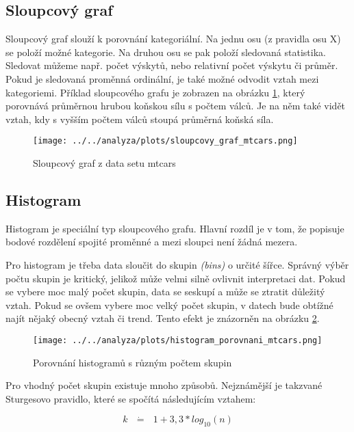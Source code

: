 {\color{red}
\subsection{Sloupcový graf}
Sloupcový graf slouží k porovnání kategoriální. Na jednu osu (z pravidla osu X) se položí možné kategorie. Na druhou osu
se pak položí sledovaná statistika. Sledovat můžeme např. počet výskytů, nebo relativní počet výskytu či průměr. Pokud je sledovaná proměnná ordinální,
je také možné odvodit vztah mezi kategoriemi. Příklad sloupcového grafu je zobrazen na obrázku \ref{fig:sloupcovy_graf_mtcars}, který
porovnává průměrnou hrubou koňskou sílu s počtem válců. Je na něm také vidět vztah, kdy s vyšším počtem válců stoupá průměrná koňská síla.

\begin{figure}[H]
    \centering
    \texttt{[image: ../../analyza/plots/sloupcovy\_graf\_mtcars.png]}
    \caption{Sloupcový graf z data setu mtcars} 
    \label{fig:sloupcovy_graf_mtcars}
\end{figure}

\subsection{Histogram}

Histogram je speciální typ sloupcového grafu. Hlavní rozdíl je v tom, že popisuje bodové rozdělení spojité proměnné a mezi sloupci není žádná mezera.
}
Pro histogram je třeba data sloučit do skupin \textit{(bins)} o určité šířce. Správný výběr počtu skupin je kritický, jelikož může velmi
silně ovlivnit interpretaci dat. Pokud se vybere moc malý počet skupin, data se seskupí a může se ztratit důležitý vztah. Pokud se ovšem
vybere moc velký počet skupin, v datech bude obtížné najít nějaký obecný vztah či trend.
Tento efekt je znázorněn na obrázku \ref{fig:histogram_porovnani_mtcars}.

\begin{figure}[H]
    \centering
    \texttt{[image: ../../analyza/plots/histogram\_porovnani\_mtcars.png]}
    \caption{Porovnání histogramů s různým počtem skupin} 
    \label{fig:histogram_porovnani_mtcars}
\end{figure}

Pro vhodný počet skupin existuje mnoho způsobů. Nejznámější je takzvané Sturgesovo pravidlo, které se spočítá následujícím vztahem:

\begin{equation}
    \label{eq:sturgesovo_pravidlo}
    k \text{ } \dot{\mathbf{=}} \text{ } 1 + 3,3 * log_{10}(n)
\end{equation}


